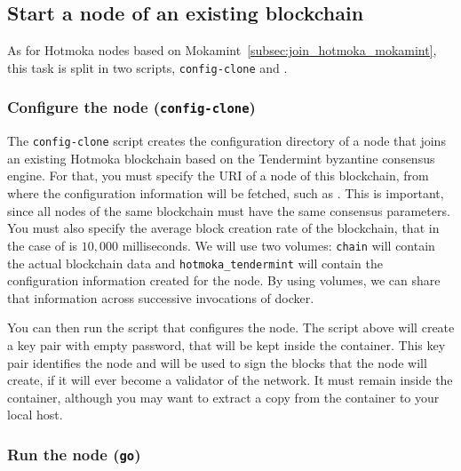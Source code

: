 \subsection{Start a node of an existing blockchain}\label{subsec:join_hotmoka_tendermint}

As for Hotmoka nodes based on Mokamint~\ref{subsec:join_hotmoka_mokamint}, this task is split in two scripts,
\texttt{config-clone} and .

\subsubsection{Configure the node (\texttt{config-clone})}\label{subsubsec:tendermint_config_clone}

The \texttt{config-clone} script creates the configuration directory of a node
that joins an existing Hotmoka blockchain based on the Tendermint byzantine
consensus engine. For that, you must specify the URI of a node of this blockchain,
from where the configuration information will be fetched, such as
\serverTendermint{}. This is important, since all nodes of the
same blockchain must have the same consensus parameters.
You must also specify the average block creation rate of the blockchain,
that in the case of \serverTendermint{} is $10,000$ milliseconds.
We will use two volumes: \texttt{chain} will contain the actual blockchain data
and \texttt{hotmoka\_tendermint} will contain the configuration information
created for the node. By using volumes, we can share that information
across successive invocations of docker.

You can then run the script that configures the node.
%
%
The script above will create a key pair with empty password, that will be kept inside the container.
This key pair identifies the node and will be used to sign the blocks that the node will create,
if it will ever become a validator of the network. It must remain inside the container,
although you may want to extract a copy from the container to your local host.

\subsubsection{Run the node (\texttt{go})}\label{subsubsec:tendermint_go}

